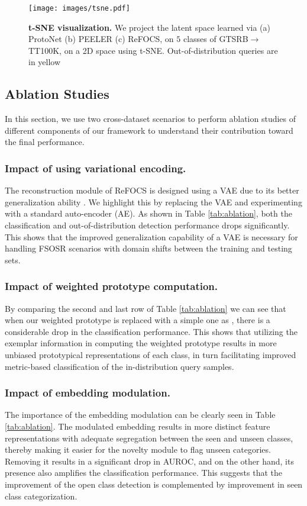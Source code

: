 \begin{figure*}[ht]
\centering
\texttt{[image: images/tsne.pdf]}
\caption{\textbf{t-SNE visualization.} We project the latent space learned via (a) ProtoNet (b) PEELER (c) ReFOCS, on $5$ classes of GTSRB$\rightarrow$TT100K, on a 2D space using t-SNE. Out-of-distribution queries are in yellow}
\label{fig:tsne}
\end{figure*}

\subsection{Ablation Studies}
In this section, we use two cross-dataset scenarios to perform ablation studies of different components of our framework to understand their contribution toward the final performance.

\subsubsection*{Impact of using variational encoding.} The reconstruction module of ReFOCS is designed using a VAE \cite{kim2019variational} due to its better generalization ability \cite{dai2018connections}. We highlight this by replacing the VAE and experimenting with a standard auto-encoder (AE). As shown in Table \ref{tab:ablation}, both the classification and out-of-distribution detection performance drops significantly. This shows that the improved generalization capability of a VAE is necessary for handling FSOSR scenarios with domain shifts between the training and testing sets.

\subsubsection*{Impact of weighted prototype computation.}
By comparing the second and last row of Table \ref{tab:ablation} we can see that when our weighted prototype is replaced with a simple one as \cite{proto_net}, there is a considerable drop in the classification performance. This shows that utilizing the exemplar information in computing the weighted prototype results in more unbiased prototypical representations of each class, in turn facilitating improved metric-based classification of the in-distribution query samples.

\subsubsection*{Impact of embedding modulation.} The importance of the embedding modulation can be clearly seen in Table \ref{tab:ablation}. The modulated embedding results in more distinct feature representations with adequate segregation between the seen and unseen classes, thereby making it easier for the novelty module to flag unseen categories. Removing it results in a significant drop in AUROC, and on the other hand, its presence also amplifies the classification performance. This suggests that the improvement of the open class detection is complemented by improvement in seen class categorization.


